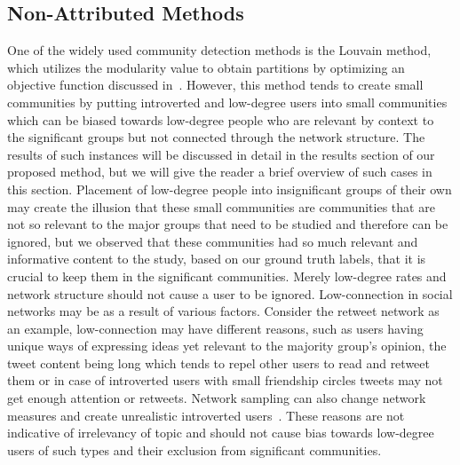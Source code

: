 \subsection{Non-Attributed Methods}
One of the widely used community detection methods is the Louvain method, which utilizes the modularity value to obtain partitions by optimizing an objective function discussed in~\cite{blondel2008fast}. However, this method tends to create small communities by putting introverted and low-degree users into small communities which can be biased towards low-degree people who are relevant by context to the significant groups but not connected through the network structure. The results of such instances will be discussed in detail in the results section of our proposed method, but we will give the reader a brief overview of such cases in this section. 
Placement of low-degree people into insignificant groups of their own may create the illusion that these small communities are communities that are not so relevant to the major groups that need to be studied and therefore can be ignored, but we observed that these communities had so much relevant and informative content to the study, based on our ground truth labels, that it is crucial to keep them in the significant communities. Merely low-degree rates and network structure should not cause a user to be ignored.
Low-connection in social networks may be as a result of various factors. Consider the retweet network as an example, low-connection may have different reasons, such as users having unique ways of expressing ideas yet relevant to the majority group's opinion, the tweet content being long which tends to repel other users to read and retweet them or in case of introverted users with small friendship circles tweets may not get enough attention or retweets. Network sampling can also change network measures and create unrealistic introverted users~\cite{gonzalez2014assessing,morstatter2013sample}. These reasons are not indicative of irrelevancy of topic and should not cause bias towards low-degree users of such types and their exclusion from significant communities.
